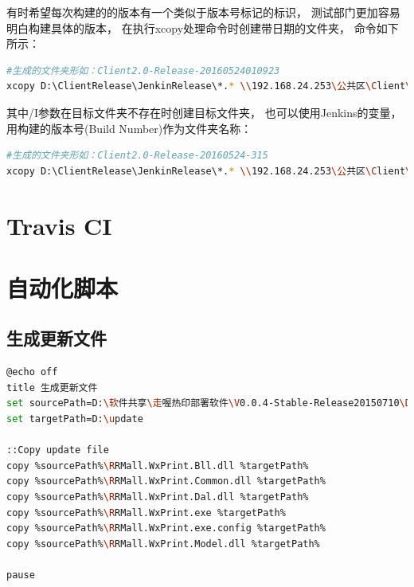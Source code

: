\documentclass{book}
\begin{document}
有时希望每次构建的的版本有一个类似于版本号标记的标识，
测试部门更加容易明白构建具体的版本，
在执行xcopy处理命令时创建带日期的文件夹，
命令如下所示：

\begin{lstlisting}[language=Bash]
#生成的文件夹形如：Client2.0-Release-20160524010923
xcopy D:\ClientRelease\JenkinRelease\*.* \\192.168.24.253\公共区\Client\2.0\Client2.0-Release-%date:~0,4%%date:~5,2%%date:~8,2%0%time:~1,1%%time:~3,2%%time:~6,2% /S /R /Y /I
\end{lstlisting}

其中/I参数在目标文件夹不存在时创建目标文件夹，
也可以使用Jenkins的变量，用构建的版本号(Build Number)作为文件夹名称：

\begin{lstlisting}[language=Bash]
#生成的文件夹形如：Client2.0-Release-20160524-315
xcopy D:\ClientRelease\JenkinRelease\*.* \\192.168.24.253\公共区\Client\2.0\Client2.0-Release-%date:~0,4%%date:~5,2%%date:~8,2%-%BUILD_NUMBER% /S /R /Y /I
\end{lstlisting}

\section{Travis CI}


\section{自动化脚本}

\subsection{生成更新文件}

\begin{lstlisting}[language=Bash]
@echo off
title 生成更新文件
set sourcePath=D:\软件共享\走喔热印部署软件\V0.0.4-Stable-Release20150710\Debug
set targetPath=D:\update

::Copy update file
copy %sourcePath%\RRMall.WxPrint.Bll.dll %targetPath%
copy %sourcePath%\RRMall.WxPrint.Common.dll %targetPath%
copy %sourcePath%\RRMall.WxPrint.Dal.dll %targetPath%
copy %sourcePath%\RRMall.WxPrint.exe %targetPath%
copy %sourcePath%\RRMall.WxPrint.exe.config %targetPath%
copy %sourcePath%\RRMall.WxPrint.Model.dll %targetPath%

pause
\end{lstlisting}
\end{document}
